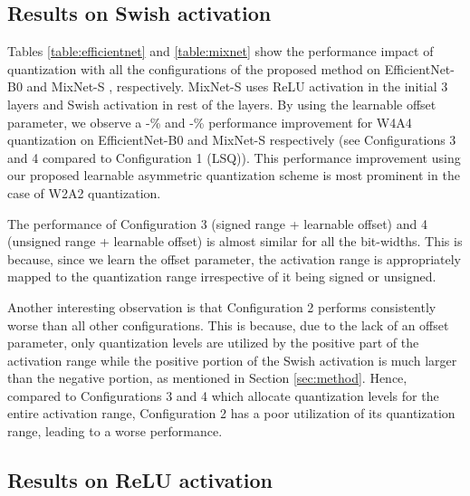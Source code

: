 \documentclass[10pt,twocolumn,letterpaper]{article}
\begin{document}
\subsection{Results on Swish activation}
\label{results:swish}
Tables \ref{table:efficientnet} and \ref{table:mixnet} show the performance impact of quantization with all the configurations of the proposed method on EfficientNet-B0 \cite{efficientnet} and MixNet-S \cite{mixnet}, respectively. MixNet-S uses ReLU activation in the initial 3 layers and Swish activation in rest of the layers. By using the learnable offset parameter, we observe a -\% and -\% performance improvement for W4A4 quantization on EfficientNet-B0 and MixNet-S respectively (see Configurations 3 and 4 compared to Configuration 1 (LSQ)). This performance improvement using our proposed learnable asymmetric quantization scheme is most prominent in the case of W2A2 quantization.

The performance of Configuration 3 (signed range + learnable offset) and 4 (unsigned range + learnable offset) is almost similar for all the bit-widths. This is because, since we learn the offset parameter, the activation range is appropriately mapped to the quantization range irrespective of it being signed or unsigned.

Another interesting observation is that Configuration 2 performs consistently worse than all other configurations. This is because, due to the lack of an offset parameter, only  quantization levels are utilized by the positive part of the activation range while the positive portion of the Swish activation is much larger than the negative portion, as mentioned in Section \ref{sec:method}. Hence, compared to Configurations 3 and 4 which allocate  quantization levels for the entire activation range, Configuration 2 has a poor utilization of its quantization range, leading to a worse performance.


\subsection{Results on ReLU activation}
\label{results:relu}
\end{document}
